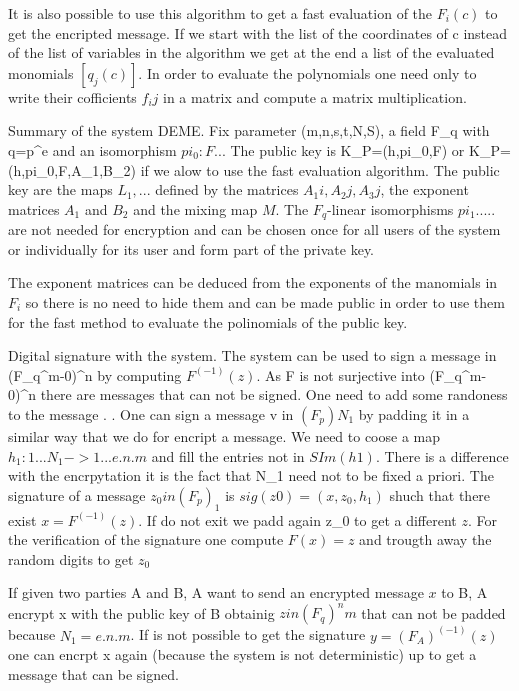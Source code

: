 \documentclass[12pt,a4paper]{amsart}
\theoremstyle{remark}
\theoremstyle{definition}
\begin{document}
It is also possible to use this algorithm to get a fast evaluation of the $F_i(c)$ to get the encripted  message. If we  start with the list of the coordinates of c instead of the list of variables in the algorithm we get at the end a list of the evaluated monomials $[q_j(c)]$. In order to   evaluate the polynomials one need only to write their cofficients   $f_ij$  in a matrix and compute a matrix multiplication.

Summary  of the system DEME.
Fix parameter (m,n,s,t,N,S), a field F_q with q=p^e and an isomorphism $pi_0: F...$
The public key is K_P=(h,pi_0,F) or  K_P=(h,pi_0,F,A_1,B_2) if we alow to use the fast evaluation algorithm.
The public key are the maps $L_1,...$ defined by the matrices ${A_1i},{A_2j},{A_3j}$, the exponent matrices
$A_1$ and $B_2$ and the mixing map $M$. 
The $F_q$-linear isomorphisms $pi_1.....$
are not needed for encryption and can be chosen once for all users of the system or individually for its user and  form part of the private key.



The exponent matrices can be deduced from the exponents of the manomials in $F_i$ so there is no need to hide them and can be made public in order to use them for the fast method to evaluate the polinomials of the public key.

Digital signature with the system.
The system can be used to sign  a message in (F_q^m-{0})^n by computing $F^(-1)(z)$. As F is not surjective into (F_q^m-{0})^n there are messages that can not be signed. One need to add some randoness to the message
.
.
One can sign a message v in $(F_p)N_1$ by padding it in a similar way that we do for encript a message.
We need to coose a map $h_1:{1...N_1} ->  {1...e.n.m}$ and fill the entries not in $SIm(h1)$. There is a  difference  with the encrpytation it is the fact that N_1 need not to be fixed a priori. 
The signature of a message $z_0 in (F_p)_1$ is 
$sig(z0)=(x,z_0,h_1)$ shuch that there exist $x=F^(-1)(z)$. If do not exit we padd again z_0 to get a different $z$.
For the verification of the signature one compute $F(x)=z$ and trougth away the random digits to get $z_0$

If given two parties A and B, A want to send an encrypted message $x$ to B, A encrypt x with the public key 
of B obtainig $z in (F_q)^nm$ that can not be padded because $N_1=e.n.m$. If is not possible to get the signature $y=(F_A)^(-1)(z)$ one can encrpt x again (because the system is not deterministic) up to get a message that can be signed.
\end{document}
